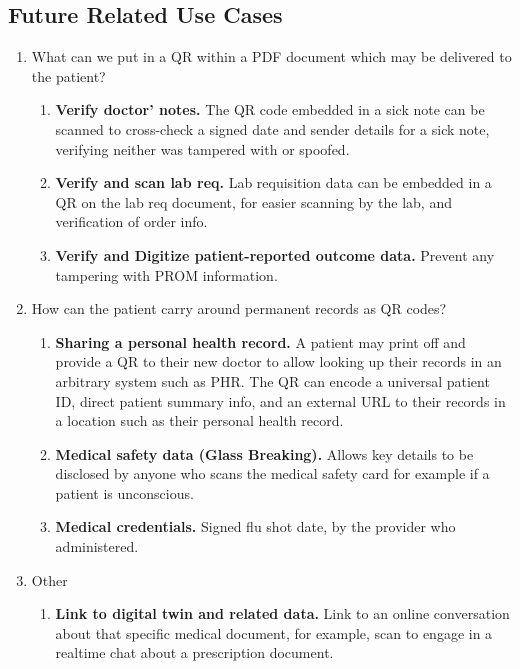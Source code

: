 \documentclass[12pt,a4paper]{article}
\begin{document}
\subsection{Future Related Use Cases}
\begin{enumerate}[label=\arabic*.]
\item What can we put in a QR within a PDF document which may be delivered to the patient?
\begin{enumerate}[label=\alph*.]
\item \textbf{Verify doctor’ notes.} The QR code embedded in a sick note can be scanned to cross-check a signed date and sender details for a sick note, verifying neither was tampered with or spoofed.
\item \textbf{Verify and scan lab req.} Lab requisition data can be embedded in a QR on the lab req document, for easier scanning by the lab, and verification of order info.
\item \textbf{Verify and Digitize patient-reported outcome data.} Prevent any tampering with PROM information.
\end{enumerate}
\item How can the patient carry around permanent records as QR codes?

\begin{enumerate}[label=\alph*.]
\item \textbf{Sharing a personal health record.} A patient may print off and provide a QR to their new doctor to allow looking up their records in an arbitrary system such as PHR. The QR can encode a universal patient ID, direct patient summary info, and an external URL to their records in a location such as their personal health record.
\item \textbf{Medical safety data (Glass Breaking).} Allows key details to be disclosed by anyone who scans the medical safety card for example if a patient is unconscious.
\item \textbf{Medical credentials.} Signed flu shot date, by the provider who administered.
\end{enumerate}
\item Other

\begin{enumerate}[label=\alph*.]
\item \textbf{Link to digital twin and related data.} Link to an online conversation about that specific medical document, for example, scan to engage in a realtime chat about a prescription document.
\end{enumerate}
\end{enumerate}
\end{document}
